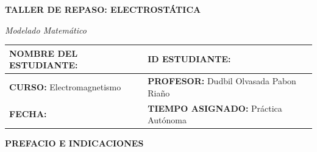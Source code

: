 \documentclass[11pt,letterpaper]{article}
\newcommand{\NombreCurso}{Electromagnetismo}
\newcommand{\NombreProfesor}{Dudbil Olvasada Pabon Riaño}
\newcommand{\FechaExamen}{}
\newcommand{\TiempoExamen}{Práctica Autónoma}
\newcommand{\TituloEvaluacion}{TALLER DE REPASO: ELECTROSTÁTICA}
\begin{document}
\vspace*{1cm}
\begin{center}
  {\fontsize{20}{24}\selectfont\bfseries\color{eTenPrimary}\TituloEvaluacion}\par
  \vspace{0.3cm}
  {\large\textit{Modelado Matemático}}\par
\end{center}
\vspace{1cm}

\noindent
{}
\begin{tabularx}{\textwidth}{|>{\raggedright\arraybackslash}X|>{\raggedright\arraybackslash}X|}
\hline
\rowcolor{eTenPrimary!10}
\textbf{\color{eTenPrimary}NOMBRE DEL ESTUDIANTE:} & \textbf{\color{eTenPrimary}ID ESTUDIANTE:} \\[15pt]
\hline
\textbf{\color{eTenPrimary}CURSO:} \NombreCurso & \textbf{\color{eTenPrimary}PROFESOR:} \NombreProfesor \\
\hline
\textbf{\color{eTenPrimary}FECHA:} \FechaExamen & \textbf{\color{eTenPrimary}TIEMPO ASIGNADO:} \TiempoExamen \\
\hline
\end{tabularx}

\vspace{1cm}

{\fontsize{14}{17}\selectfont\bfseries\color{eTenPrimary} PREFACIO E INDICACIONES}
\end{document}
